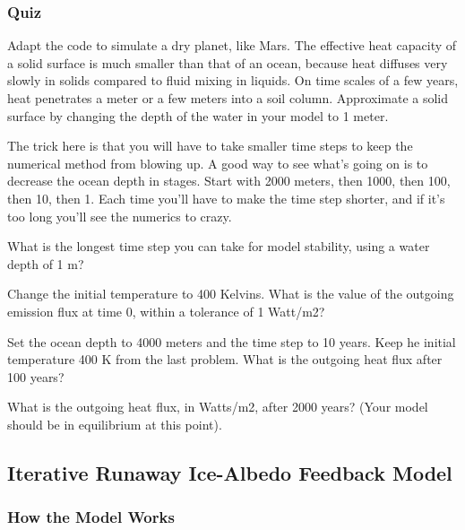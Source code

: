 \subsubsection{Quiz}\index{}
Adapt the code to simulate a dry planet, like Mars. The effective heat capacity of a solid surface is much smaller than that of an ocean, because heat diffuses very slowly in solids compared to fluid mixing in liquids. On time scales of a few years, heat penetrates a meter or a few meters into a soil column. Approximate a solid surface by changing the depth of the water in your model to 1 meter.

The trick here is that you will have to take smaller time steps to keep the numerical method from blowing up. A good way to see what's going on is to decrease the ocean depth in stages. Start with 2000 meters, then 1000, then 100, then 10, then 1. Each time you'll have to make the time step shorter, and if it's too long you'll see the numerics to crazy.

What is the longest time step you can take for model stability, using a water depth of 1 m?



Change the initial temperature to 400 Kelvins. What is the value of the outgoing emission flux at time 0, within a tolerance of 1 Watt/m2?



Set the ocean depth to 4000 meters and the time step to 10 years. Keep he initial temperature 400 K from the last problem. What is the outgoing heat flux after 100 years?



What is the outgoing heat flux, in Watts/m2, after 2000 years? (Your model should be in equilibrium at this point).




\subsection{Iterative Runaway Ice-Albedo Feedback Model}

\subsubsection{How the Model Works}\index{}

